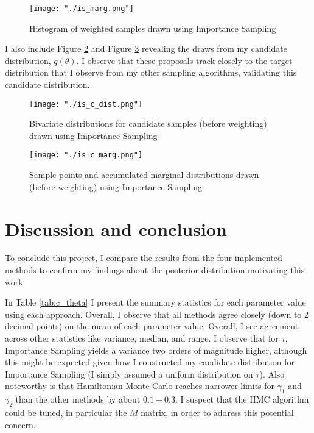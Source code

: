 \documentclass{article}
\begin{document}
\begin{figure}[H]
  \centering
  \texttt{[image: "./is\_marg.png"]}
  \caption{\label{fig:is_marg} Histogram of weighted samples drawn using Importance Sampling}
\end{figure}

I also include Figure \ref{fig:is_c_dist} and Figure \ref{fig:is_c_marg} revealing the draws from my candidate distribution, $q(\theta)$. I observe that these proposals track closely to the target distribution that I observe from my other sampling algorithms, validating this candidate distribution.

\begin{figure}[H]
  \centering
  \texttt{[image: "./is\_c\_dist.png"]}
  \caption{\label{fig:is_c_dist} Bivariate distributions for candidate samples (before weighting) drawn using Importance Sampling}
\end{figure}

\begin{figure}[H]
  \centering
  \texttt{[image: "./is\_c\_marg.png"]}
  \caption{\label{fig:is_c_marg} Sample points and accumulated marginal distributions drawn (before weighting) using Importance Sampling}
\end{figure}







\section{Discussion and conclusion}
To conclude this project, I compare the results from the four implemented methods to confirm my findings about the posterior distribution motivating this work. 

In Table \ref{tab:c_theta} I present the summary statistics for each parameter value using each approach. Overall, I observe that all methods agree closely (down to 2 decimal points) on the mean of each parameter value. Overall, I see agreement across other statistics like variance, median, and range. I observe that for $\tau$, Importance Sampling yields a variance two orders of magnitude higher, although this might be expected given how I constructed my candidate distribution for Importance Sampling (I simply assumed a uniform distribution on $\tau$). Also noteworthy is that Hamiltonian Monte Carlo reaches narrower limits for $\gamma_1$ and $\gamma_2$ than the other methods by about $0.1 - 0.3$. I suspect that the HMC algorithm could be tuned, in particular the $M$ matrix, in order to address this potential concern. 
\end{document}
